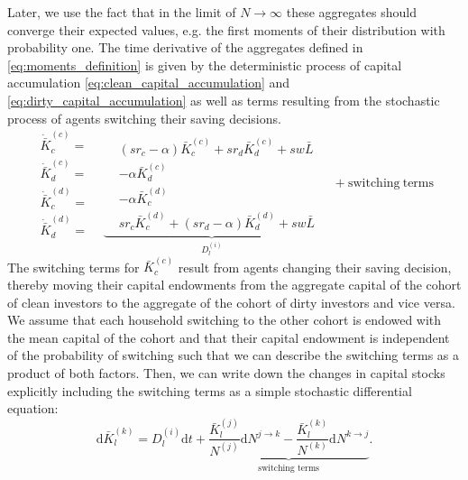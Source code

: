Later, we use the fact that in the limit of $N \rightarrow \infty$ these aggregates should converge their expected values, e.g. the first moments of their distribution with probability one.
The time derivative of the aggregates defined in \eqref{eq:moments_definition} is given by the deterministic process of capital accumulation \eqref{eq:clean_capital_accumulation} and \eqref{eq:dirty_capital_accumulation} as well as terms resulting from the stochastic process of agents switching their saving decisions. 
\begin{equation}
      \begin{aligned}
          \dot{\bar{K}}_c^{(c)} =&  \\
          \dot{\bar{K}}_d^{(c)} =&  \\
          \dot{\bar{K}}_c^{(d)} =&  \\
          \dot{\bar{K}}_d^{(d)} =& 
      \end{aligned}
  \underbrace{ 
      \begin{aligned}
      &(sr_c - \alpha)\bar{K}_c^{(c)} + s r_d \bar{K}_d^{(c)} + s w \bar{L} \\
      &- \alpha\bar{K}_d^{(c)} \\
      &- \alpha\bar{K}_c^{(d)} \\
      &sr_c \bar{K}_c^{(d)} + (s r_d - \alpha)\bar{K}_d^{(d)} + s w \bar{L}
      \end{aligned}
  }_{\textstyle D^{(i)}_{l} } \quad + \mathrm{switching\ terms} \label{eq:sterm0}
\end{equation}
The switching terms for $\bar{K}_c^{(c)}$ result from agents changing their saving decision, thereby moving their capital endowments from the aggregate capital of the cohort of clean investors to the aggregate of the cohort of dirty investors and vice versa. We assume that each household switching to the other cohort is endowed with the mean capital of the cohort and that their capital endowment is independent of the probability of switching such that we can describe the switching terms as a product of both factors. Then, we can write down the changes in capital stocks explicitly including the switching terms as a simple stochastic differential equation:
\begin{equation}
	{\mathrm d}\bar{K}_{l}^{(k)} = D^{(i)}_{l} {\mathrm d}t + \underbrace{\frac{\bar{K}_l^{(j)}}{N^{(j)}} {\mathrm d} N^{j \rightarrow k} -  \frac{\bar{K}_l^{(k)}}{N^{(k)}} {\mathrm d} N^{k \rightarrow j} }_{\text{switching terms}}.
	\label{eq:aggregated_capital_time_derivative}
\end{equation}

